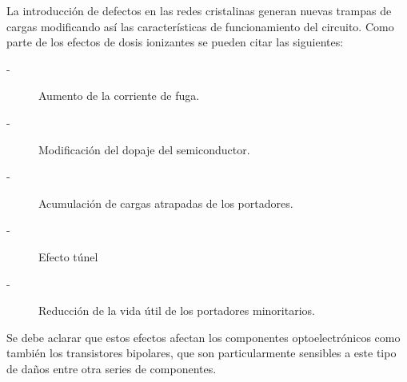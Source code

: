  La introducción de defectos en las redes cristalinas generan nuevas trampas de cargas modificando así las características de funcionamiento del circuito. Como parte de los efectos de dosis ionizantes se pueden citar las siguientes:

\begin{description}
\item[-] Aumento de la corriente de fuga.
\item[-] Modificación del dopaje del semiconductor.
\item[-] Acumulación de cargas atrapadas de los portadores.
\item[-] Efecto túnel
\item[-] Reducción de la vida útil de los portadores minoritarios.
\end{description}


Se debe aclarar que estos efectos afectan los componentes optoelectrónicos como también los transistores bipolares, que son particularmente sensibles a este tipo de daños entre otra series de componentes.